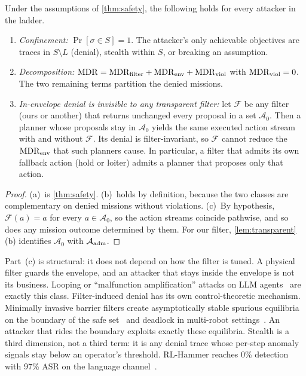 \begin{proposition}\label{prop:liveness}
Under the assumptions of \cref{thm:safety}, the following holds for every
attacker in the ladder.
\begin{enumerate}[label=(\alph*)]
\item \emph{Confinement:} $\Pr[\sigma\in S]=1$. The attacker's only
  achievable objectives are traces in $S\setminus L$ (denial), stealth
  within $S$, or breaking an assumption.
\item \emph{Decomposition:} $\mathrm{MDR}=\mathrm{MDR}_{\mathrm{filter}}+\mathrm{MDR}_{\mathrm{env}}+\mathrm{MDR}_{\mathrm{viol}}$
  with $\mathrm{MDR}_{\mathrm{viol}}=0$. The two remaining terms partition the denied
  missions.
\item \emph{In-envelope denial is invisible to any transparent filter:}
  let $\mathcal F$ be any filter (ours or another) that returns unchanged
  every proposal in a set $\mathcal A_0$. Then a planner whose proposals stay
  in $\mathcal A_0$ yields the same executed action stream with and without
  $\mathcal F$. Its denial is filter-invariant, so $\mathcal F$ cannot reduce
  the $\mathrm{MDR}_{\mathrm{env}}$ that such planners cause. In particular, a filter
  that admits its own fallback action (hold or loiter) admits a planner that
  proposes only that action.
\end{enumerate}
\end{proposition}
\begin{proof}
(a)~is \cref{thm:safety}. (b)~holds by definition, because the two classes
are complementary on denied missions without violations. (c)~By hypothesis,
$\mathcal F(a)=a$ for every $a\in\mathcal A_0$, so the action streams coincide
pathwise, and so does any mission outcome determined by them. For our
filter, \cref{lem:transparent}(b) identifies $\mathcal A_0$ with
$\mathcal{A}_{\mathrm{adm}}$.
\end{proof}

Part~(c) is structural: it does not depend on how the filter is tuned. A
physical filter guards the envelope, and an attacker that stays inside the
envelope is not its business. Looping or ``malfunction amplification''
attacks on LLM agents~\cite{zhang2024breakingagents} are exactly this class.
Filter-induced denial has its own control-theoretic mechanism. Minimally
invasive barrier filters create asymptotically stable spurious equilibria
on the boundary of the safe set~\cite{reis2021undesired} and deadlock in
multi-robot settings~\cite{grover2020deadlock}. An attacker that rides the
boundary exploits exactly these equilibria. Stealth is a third dimension, not
a third term: it is any denial trace whose per-step anomaly signals stay below
an operator's threshold. RL-Hammer reaches 0\% detection with 97\% ASR on the
language channel~\cite{wen2025rlhammer}.

